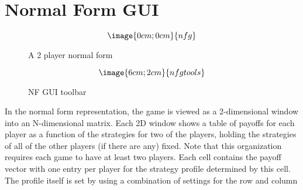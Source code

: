 \section{Normal Form GUI}

\begin{figure}
$$\image{0cm;0cm}{nfg}$$
\caption{A 2 player normal form}\label{fig_nfg}
\end{figure}

\begin{figure}
$$\image{6cm;2cm}{nfgtools}$$
\caption{NF GUI toolbar}\label{fig_nfgtools}
\end{figure}

In the normal form representation, the game is viewed as a 2-dimensional
window into an N-dimensional matrix.  Each 2D window shows a table of
payoffs for each player as a function of the strategies for two of the
players, holding the strategies of all of the other players (if there are
any) fixed.  Note that this organization requires each game to have at least
two players.  Each cell contains the payoff vector with one entry per
player for the strategy profile determined by this cell.  The profile
itself is set by using a combination of settings for the row and column
